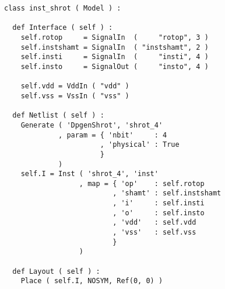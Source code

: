 \begin{itemize}
\begin{verbatim}
class inst_shrot ( Model ) :

  def Interface ( self ) :
    self.rotop     = SignalIn  (     "rotop", 3 )
    self.instshamt = SignalIn  ( "instshamt", 2 )
    self.insti     = SignalIn  (     "insti", 4 )
    self.insto     = SignalOut (     "insto", 4 )
    
    self.vdd = VddIn ( "vdd" )
    self.vss = VssIn ( "vss" )
    
  def Netlist ( self ) :
    Generate ( 'DpgenShrot', 'shrot_4'
             , param = { 'nbit'     : 4
                       , 'physical' : True
                       }
             )
    self.I = Inst ( 'shrot_4', 'inst'
                  , map = { 'op'    : self.rotop
                          , 'shamt' : self.instshamt
                          , 'i'     : self.insti
                          , 'o'     : self.insto
                          , 'vdd'   : self.vdd
                          , 'vss'   : self.vss
                          }
                  )
    
  def Layout ( self ) :
    Place ( self.I, NOSYM, Ref(0, 0) )
\end{verbatim}
\end{itemize}
